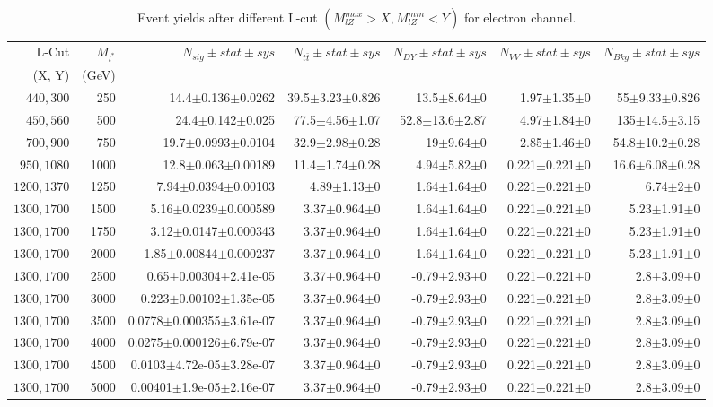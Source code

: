 \documentclass[]{article}
\begin{document}
\begin{table}
\begin{center}
\scriptsize{
\begin{tabular}{ |r|r|r|r|r|r|r|}
\hline 
L-Cut & $M_{l^*}$ & $N_{sig}\pm stat \pm sys $ &$N_{t\bar{t}}\pm stat \pm sys $ & $N_{DY}\pm stat \pm sys $ & $N_{VV}\pm stat \pm sys $ &$N_{Bkg}\pm stat \pm sys$\\
(X, Y) & (GeV) & && &&\\
\hline 
$440, 300$ & 250 & 14.4$\pm$0.136$\pm$0.0262 & 39.5$\pm$3.23$\pm$0.826 & 13.5$\pm$8.64$\pm$0 & 1.97$\pm$1.35$\pm$0 & 55$\pm$9.33$\pm$0.826 \\
$450, 560$ & 500 & 24.4$\pm$0.142$\pm$0.025 & 77.5$\pm$4.56$\pm$1.07 & 52.8$\pm$13.6$\pm$2.87 & 4.97$\pm$1.84$\pm$0 & 135$\pm$14.5$\pm$3.15 \\
$700, 900$ & 750 & 19.7$\pm$0.0993$\pm$0.0104 & 32.9$\pm$2.98$\pm$0.28 & 19$\pm$9.64$\pm$0 & 2.85$\pm$1.46$\pm$0 & 54.8$\pm$10.2$\pm$0.28 \\
$950, 1080$ & 1000 & 12.8$\pm$0.063$\pm$0.00189 & 11.4$\pm$1.74$\pm$0.28 & 4.94$\pm$5.82$\pm$0 & 0.221$\pm$0.221$\pm$0 & 16.6$\pm$6.08$\pm$0.28 \\
$1200, 1370$ & 1250 & 7.94$\pm$0.0394$\pm$0.00103 & 4.89$\pm$1.13$\pm$0 & 1.64$\pm$1.64$\pm$0 & 0.221$\pm$0.221$\pm$0 & 6.74$\pm$2$\pm$0 \\
$1300, 1700$ & 1500 & 5.16$\pm$0.0239$\pm$0.000589 & 3.37$\pm$0.964$\pm$0 & 1.64$\pm$1.64$\pm$0 & 0.221$\pm$0.221$\pm$0 & 5.23$\pm$1.91$\pm$0 \\
$1300, 1700$ & 1750 & 3.12$\pm$0.0147$\pm$0.000343 & 3.37$\pm$0.964$\pm$0 & 1.64$\pm$1.64$\pm$0 & 0.221$\pm$0.221$\pm$0 & 5.23$\pm$1.91$\pm$0 \\
$1300, 1700$ & 2000 & 1.85$\pm$0.00844$\pm$0.000237 & 3.37$\pm$0.964$\pm$0 & 1.64$\pm$1.64$\pm$0 & 0.221$\pm$0.221$\pm$0 & 5.23$\pm$1.91$\pm$0 \\
$1300, 1700$ & 2500 & 0.65$\pm$0.00304$\pm$2.41e-05 & 3.37$\pm$0.964$\pm$0 & -0.79$\pm$2.93$\pm$0 & 0.221$\pm$0.221$\pm$0 & 2.8$\pm$3.09$\pm$0 \\
$1300, 1700$ & 3000 & 0.223$\pm$0.00102$\pm$1.35e-05 & 3.37$\pm$0.964$\pm$0 & -0.79$\pm$2.93$\pm$0 & 0.221$\pm$0.221$\pm$0 & 2.8$\pm$3.09$\pm$0 \\
$1300, 1700$ & 3500 & 0.0778$\pm$0.000355$\pm$3.61e-07 & 3.37$\pm$0.964$\pm$0 & -0.79$\pm$2.93$\pm$0 & 0.221$\pm$0.221$\pm$0 & 2.8$\pm$3.09$\pm$0 \\
$1300, 1700$ & 4000 & 0.0275$\pm$0.000126$\pm$6.79e-07 & 3.37$\pm$0.964$\pm$0 & -0.79$\pm$2.93$\pm$0 & 0.221$\pm$0.221$\pm$0 & 2.8$\pm$3.09$\pm$0 \\
$1300, 1700$ & 4500 & 0.0103$\pm$4.72e-05$\pm$3.28e-07 & 3.37$\pm$0.964$\pm$0 & -0.79$\pm$2.93$\pm$0 & 0.221$\pm$0.221$\pm$0 & 2.8$\pm$3.09$\pm$0 \\
$1300, 1700$ & 5000 & 0.00401$\pm$1.9e-05$\pm$2.16e-07 & 3.37$\pm$0.964$\pm$0 & -0.79$\pm$2.93$\pm$0 & 0.221$\pm$0.221$\pm$0 & 2.8$\pm$3.09$\pm$0 \\
\hline 
\end{tabular}
}
\end{center}
\caption{Event yields after different L-cut $(M_{lZ}^{max} > X, M_{lZ}^{min} < Y)$ for electron channel.}
\end{table}
\end{document}
